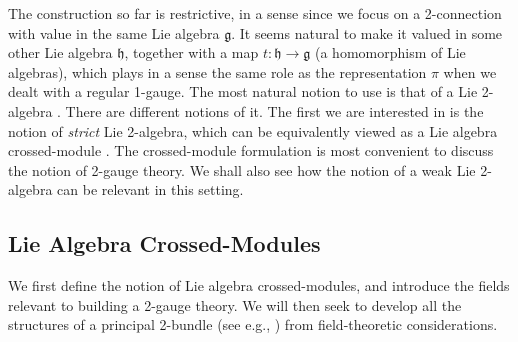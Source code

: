 \documentclass[onecolumn]{article}
\theoremstyle{theorem}
\theoremstyle{remark}
\theoremstyle{example}
\theoremstyle{definition}
\numberwithin{equation}{section}
\begin{document}





The construction so far is restrictive, in a sense since we focus on a 2-connection with value in the same Lie algebra  $\mathfrak{g}$. It seems natural to make it valued   in some other Lie algebra $\mathfrak{h}$, together with a map $t:\mathfrak{h}\rightarrow\mathfrak{g}$ (a homomorphism of Lie algebras), which plays in a sense the same role as the representation $\pi$ when we dealt with a regular 1-gauge. The most natural notion to use is that of a Lie 2-algebra \cite{Baez:2003fs}. There are different notions of  it. The first we are interested in is the notion of {\it {strict}} Lie 2-algebra, which can be equivalently viewed as a Lie algebra crossed-module \cite{Wag:2006}.  The crossed-module formulation is most convenient to discuss the notion of 2-gauge theory. We shall also see how the notion of a weak Lie 2-algebra can be relevant in this setting.

\subsection{Lie Algebra Crossed-Modules} 
We first define the notion of Lie algebra crossed-modules, and introduce the fields relevant to building a 2-gauge theory. We will then seek to develop all the structures of a principal 2-bundle (see e.g., \cite{Wockel2008Principal2A}) from field-theoretic considerations.
\end{document}

